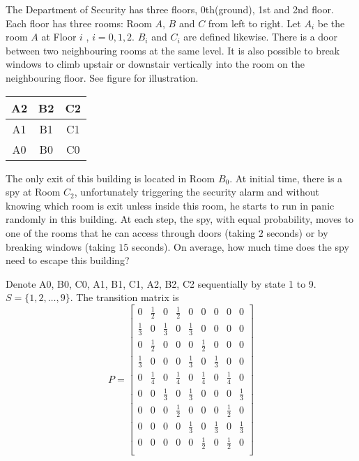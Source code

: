 \documentclass[  11pt]{article}
\newcommand{\optional}{ {\it optional} }
\begin{document}
\begin{ExerciseList}
\Exercise[name=\optional, difficulty=5] The Department of Security  has  three floors, 0th(ground), 1st  and 2nd floor.
Each floor has three rooms: Room $A$, $B$ and $C$ from left to right.
Let $A_i$ be the room $A$ at Floor $i$ , $i=0,1,2$. $B_i$ and $C_i$ are defined likewise.
There is a door between two  neighbouring rooms at the same level.
It is also possible to break windows to climb upstair or downstair vertically into the room on the neighbouring floor. See figure for illustration.

 \begin{center}
\begin{tabular}{|c|c|c|}
\hline
A2 & B2 & C2 \\
\hline
A1 & B1 & C1 \\
\hline
A0 & B0 & C0 \\
\hline
\end{tabular}
\end{center}

The only exit of this building is located in Room $B_0$.
At initial time,  there is a spy at Room $C_2$,   unfortunately  triggering  the security alarm 
and without knowing which room is exit unless inside this room,  he starts to run in panic randomly in this building. At each step,  the spy, with equal probability, moves to one of  the rooms that he can access
through  doors (taking $2$ seconds)  or by  breaking windows (taking $15$ seconds). On average, how much time does the spy need to escape this building? \\

\Answer

Denote A0, B0, C0, A1, B1, C1, A2, B2, C2 sequentially by state 1 to 9. $S = \{1, 2, \dots, 9\}$. The transition matrix is
\[P = \begin{bmatrix}
0 & \frac{1}{2} & 0 & \frac{1}{2} & 0 & 0 & 0 & 0 & 0 \\
\frac{1}{3} & 0 & \frac{1}{3} & 0 & \frac{1}{3} & 0 & 0 & 0 & 0 \\
0 & \frac{1}{2} & 0 & 0 & 0 & \frac{1}{2} & 0 & 0 & 0 \\
\frac{1}{3} & 0 & 0 & 0 & \frac{1}{3} & 0 & \frac{1}{3} & 0 & 0 \\
0 & \frac{1}{4} & 0 & \frac{1}{4} & 0 & \frac{1}{4} & 0 & \frac{1}{4} & 0 \\
0 & 0 & \frac{1}{3} & 0 & \frac{1}{3} & 0 & 0 & 0 & \frac{1}{3}\\
0 & 0 & 0 & \frac{1}{2} & 0 & 0 & 0 & \frac{1}{2} & 0 \\
0 & 0 & 0 & 0 & \frac{1}{3} & 0 & \frac{1}{3} & 0 & \frac{1}{3} \\
0 & 0 & 0 & 0 & 0 & \frac{1}{2} & 0 & \frac{1}{2} & 0\\
\end{bmatrix} \]


\end{ExerciseList}
\end{document}

